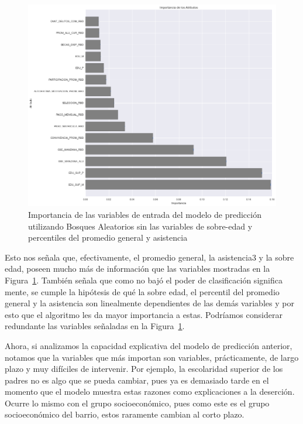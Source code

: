 \begin{figure}[H]
  \centering
    \includegraphics[trim=0cm 0cm 0cm 0cm,scale=0.4]{Figuras/7AnalisisResultado/impo-parcial.png}
      \caption{Importancia de las variables de entrada del modelo de predicción utilizando Bosques Aleatorios sin las variables de sobre-edad y percentiles del promedio general y asistencia}
    \label{fig:impo-parcial}
\end{figure}

Esto nos señala que, efectivamente, el promedio general, la asistencia3 y la sobre edad, poseen mucho más de información que las variables mostradas en la Figura~\ref{fig:impo-parcial}. También señala que como no bajó el poder de clasificación significa mente, se cumple la hipótesis de qué la sobre edad, el percentil del promedio general y la asistencia son linealmente dependientes de las demás variables y por esto que el algoritmo les da mayor importancia a estas. Podríamos considerar redundante las variables señaladas en la Figura~\ref{fig:impo-parcial}.

Ahora, si analizamos la capacidad explicativa del modelo de predicción anterior, notamos que la variables que más importan son variables, prácticamente, de largo plazo y muy difíciles de intervenir. Por ejemplo, la escolaridad superior de los padres no es algo que se pueda cambiar, pues ya es demasiado tarde en el momento que el modelo muestra estas razones como explicaciones a la deserción. Ocurre lo mismo con el grupo socioeconómico, pues como este es el grupo socioeconómico del barrio, estos raramente cambian al corto plazo.

